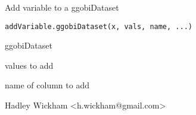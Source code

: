 \begin{Description}\relax
Add variable to a ggobiDataset
\end{Description}
\begin{Usage}
\begin{verbatim}addVariable.ggobiDataset(x, vals, name, ...)\end{verbatim}
\end{Usage}
\begin{Arguments}
\begin{ldescription}
\item[\code{x}] ggobiDataset
\item[\code{vals}] values to add
\item[\code{name}] name of column to add
\item[\code{...}] 
\end{ldescription}
\end{Arguments}
\begin{Details}\relax
\end{Details}
\begin{Author}\relax
Hadley Wickham <h.wickham@gmail.com>
\end{Author}
\begin{Examples}
\begin{ExampleCode}\end{ExampleCode}
\end{Examples}

